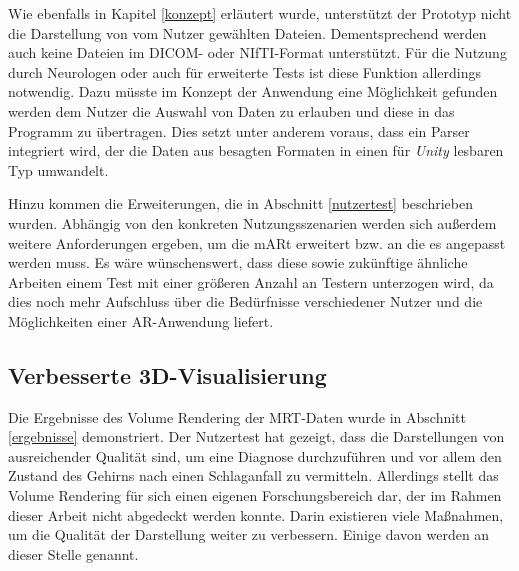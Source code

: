 Wie ebenfalls in Kapitel \ref{konzept} erläutert wurde, unterstützt der Prototyp nicht die Darstellung von vom Nutzer gewählten Dateien. Dementsprechend werden auch keine Dateien im DICOM- oder NIfTI-Format unterstützt. Für die Nutzung durch Neurologen oder auch für erweiterte Tests ist diese Funktion allerdings notwendig. Dazu müsste im Konzept der Anwendung eine Möglichkeit gefunden werden dem Nutzer die Auswahl von Daten zu erlauben und diese in das Programm zu übertragen. Dies setzt unter anderem voraus, dass ein Parser integriert wird, der die Daten aus besagten Formaten in einen für \textit{Unity} lesbaren Typ umwandelt. 

Hinzu kommen die Erweiterungen, die in Abschnitt \ref{nutzertest} beschrieben wurden. 
Abhängig von den konkreten Nutzungsszenarien werden sich außerdem weitere Anforderungen ergeben, um die mARt erweitert bzw. an die es angepasst werden muss. 
Es wäre wünschenswert, dass diese sowie zukünftige ähnliche Arbeiten einem Test mit einer größeren Anzahl an Testern unterzogen wird, da dies noch mehr Aufschluss über die Bedürfnisse verschiedener Nutzer und die Möglichkeiten einer AR-Anwendung liefert.

\subsection{Verbesserte 3D-Visualisierung}

Die Ergebnisse des Volume Rendering der MRT-Daten wurde in Abschnitt \ref{ergebnisse} demonstriert. Der Nutzertest hat gezeigt, dass die Darstellungen von ausreichender Qualität sind, um eine Diagnose durchzuführen und vor allem den Zustand des Gehirns nach einen Schlaganfall zu vermitteln. 
Allerdings stellt das Volume Rendering für sich einen eigenen Forschungsbereich dar, der im Rahmen dieser Arbeit nicht abgedeckt werden konnte. Darin existieren viele Maßnahmen, um die Qualität der Darstellung weiter zu verbessern. Einige davon werden an dieser Stelle genannt. 

